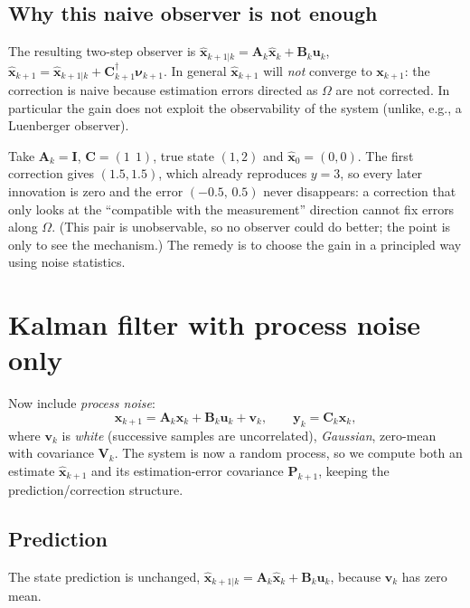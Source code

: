 \documentclass[11pt,a4paper]{article}
\newcommand{\hx}{\hat{\boldsymbol{x}}}
\newcommand{\bx}{\boldsymbol{x}}
\newcommand{\bu}{\boldsymbol{u}}
\newcommand{\by}{\boldsymbol{y}}
\newcommand{\bv}{\boldsymbol{v}}
\newcommand{\bnu}{\boldsymbol{\nu}}
\newcommand{\mA}{\mathbf{A}}
\newcommand{\mB}{\mathbf{B}}
\newcommand{\mC}{\mathbf{C}}
\newcommand{\mP}{\mathbf{P}}
\newcommand{\mV}{\mathbf{V}}
\newcommand{\mI}{\mathbf{I}}
\newcommand{\pinv}{^{\dagger}}
\newcommand{\slides}[1]{\texorpdfstring{\hspace{0.5em}{\normalfont\small\emph{(#1)}}}{}}
\theoremstyle{plain}
\theoremstyle{definition}
\theoremstyle{remark}
\begin{document}
\subsection{Why this naive observer is not enough}

The resulting two-step observer is $\hx_{k+1|k}=\mA_k\hx_k+\mB_k\bu_k$, $\hx_{k+1}=\hx_{k+1|k}+\mC_{k+1}\pinv\bnu_{k+1}$.
In general $\hx_{k+1}$ will \emph{not} converge to $\bx_{k+1}$: the correction is naive because estimation errors
directed as $\Omega$ are not corrected. In particular the gain does not exploit the observability of the system
(unlike, e.g., a Luenberger observer).

\begin{intuition}
Take $\mA_k=\mI$, $\mC=(1\ \ 1)$, true state $(1,2)$ and $\hx_0=(0,0)$. The first correction gives
$(1.5,1.5)$, which already reproduces $y=3$, so every later innovation is zero and the error $(-0.5,\,0.5)$ never
disappears: a correction that only looks at the ``compatible with the measurement'' direction cannot fix errors along
$\Omega$. (This pair is unobservable, so no observer could do better; the point is only to see the mechanism.)
The remedy is to choose the gain in a principled way using noise statistics.
\end{intuition}

\section{Kalman filter with process noise only \slides{EKF deck, slides 10--15}}

Now include \emph{process noise}:
\begin{equation}\label{eq:lin-process}
\bx_{k+1}=\mA_k\bx_k+\mB_k\bu_k+\bv_k,\qquad \by_k=\mC_k\bx_k,
\end{equation}
where $\bv_k$ is \emph{white} (successive samples are uncorrelated), \emph{Gaussian}, zero-mean with covariance $\mV_k$.
The system is now a random process, so we compute both an estimate $\hx_{k+1}$ and its estimation-error covariance
$\mP_{k+1}$, keeping the prediction/correction structure.

\subsection{Prediction}

The state prediction is unchanged, $\hx_{k+1|k}=\mA_k\hx_k+\mB_k\bu_k$, because $\bv_k$ has zero mean.
\end{document}

